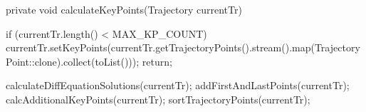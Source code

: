 private void calculateKeyPoints(Trajectory currentTr) {
    if (currentTr.length() < MAX_KP_COUNT) {
        currentTr.setKeyPoints(currentTr.getTrajectoryPoints().stream().map(TrajectoryPoint::clone).collect(toList()));
        return;
    }

    calculateDiffEquationSolutions(currentTr);
    addFirstAndLastPoints(currentTr);
    calcAdditionalKeyPoints(currentTr);
    sortTrajectoryPoints(currentTr);
}
